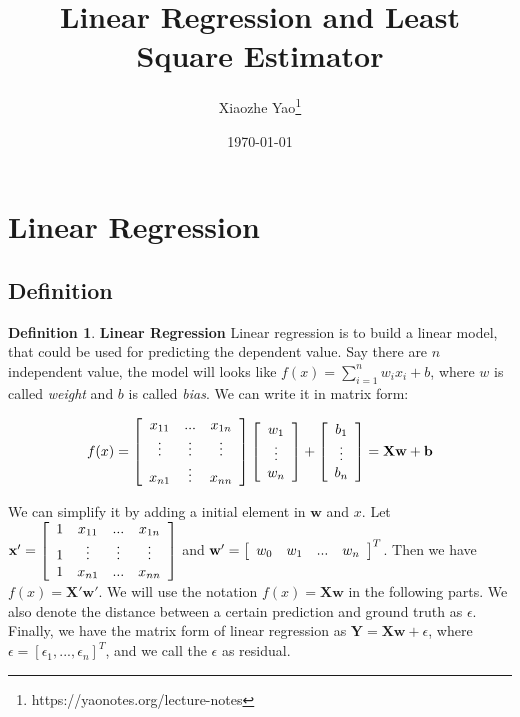 \documentclass{article}
\title{Linear Regression and Least Square Estimator}
\author{Xiaozhe Yao\footnote{https://yaonotes.org/lecture-notes}}
\date{\today}
\theoremstyle{definition}
\newtheorem{defi}{Definition}[subsection]
\begin{document}
\maketitle

\section{Linear Regression}
\subsection{Definition}
\begin{defi}
\textbf{Linear Regression} Linear regression is to build a linear model, that could be used for predicting the dependent value. Say there are $n$ independent value, the model will looks like $f(x)=\sum_{i=1}^{n}w_ix_i+b$, where $w$ is called \textit{weight} and $b$ is called \textit{bias}. We can write it in matrix form:

$$f(x)=\left[ {\begin{array}{*{20}c}
   x_{11} & ... & x_{1n} \\
   \vdots & \vdots & \vdots \\
   x_{n1} & \vdots & x_{nn} \\ 
 \end{array} } \right] \left[ {\begin{array}{*{20}c}
   w_1 \\
   \vdots \\
   w_n \\ 
 \end{array} } \right] + \left[ {\begin{array}{*{20}c}
   b_1 \\
   \vdots \\
   b_n \\ 
 \end{array} } \right] = \textbf{X}\textbf{w}+\textbf{b}$$
 
We can simplify it by adding a initial element in $\textbf{w}$ and $x$. Let $\textbf{x}'=\left[ {\begin{array}{*{20}c}
   1 & x_{11} & ...  & x_{1n}\\
   1 & \vdots  & \vdots & \vdots \\
   1 & x_{n1} & ... &x_{nn}\\
 \end{array} } \right]$ and $\textbf{w}'=\left[ {\begin{array}{*{20}c} w_0 & w_1 &... & w_n \end{array} } \right]^{T}$. Then we have $f(x)=\textbf{X}'\textbf{w}'$. We will use the notation $f(x)=\textbf{X}\textbf{w}$ in the following parts. We also denote the distance between a certain prediction and ground truth as $\epsilon$. Finally, we have the matrix form of linear regression as $\textbf{Y}=\textbf{X}\textbf{w} + \epsilon$, where $\epsilon = [\epsilon_1, ..., \epsilon_n]^{T}$, and we call the $\epsilon$ as residual.


\end{defi}
\end{document}
